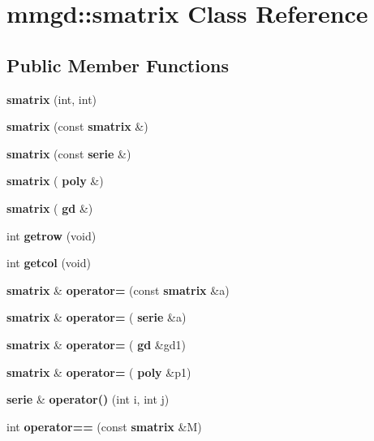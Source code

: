 \section{mmgd\+:\+:smatrix Class Reference}
\label{classmmgd_1_1smatrix}
\subsection*{Public Member Functions}
\begin{DoxyCompactItemize}
\item 
\mbox{\label{classmmgd_1_1smatrix_a175fc2703b8ffa5b6308c8ab6449f3e2}} 
{\bfseries smatrix} (int, int)
\item 
\mbox{\label{classmmgd_1_1smatrix_af94d3fe1607ac05e049f930c8ae12ea9}} 
{\bfseries smatrix} (const \textbf{ smatrix} \&)
\item 
\mbox{\label{classmmgd_1_1smatrix_a4f365fd4d1ba7decbab9ab0d66b7aed7}} 
{\bfseries smatrix} (const \textbf{ serie} \&)
\item 
\mbox{\label{classmmgd_1_1smatrix_a1ab2721af28124648faa279cea205d91}} 
{\bfseries smatrix} (\textbf{ poly} \&)
\item 
\mbox{\label{classmmgd_1_1smatrix_a4efebaaf81df5c7e67752e54470e8025}} 
{\bfseries smatrix} (\textbf{ gd} \&)
\item 
\mbox{\label{classmmgd_1_1smatrix_adb8385c2afd74935aeff640f67059f04}} 
int {\bfseries getrow} (void)
\item 
\mbox{\label{classmmgd_1_1smatrix_a5ef4a570edc52de17e8b80eaf095b821}} 
int {\bfseries getcol} (void)
\item 
\mbox{\label{classmmgd_1_1smatrix_ac71794ee7a05765a948b1a766ac907be}} 
\textbf{ smatrix} \& {\bfseries operator=} (const \textbf{ smatrix} \&a)
\item 
\mbox{\label{classmmgd_1_1smatrix_a7a91c38c299f6298be6e02a3589b0fbb}} 
\textbf{ smatrix} \& {\bfseries operator=} (\textbf{ serie} \&a)
\item 
\mbox{\label{classmmgd_1_1smatrix_a341d8a5ac99e9cc51d0a55eca238cc89}} 
\textbf{ smatrix} \& {\bfseries operator=} (\textbf{ gd} \&gd1)
\item 
\mbox{\label{classmmgd_1_1smatrix_af9c342388d0a9f8ee12d7c4f904cfbcd}} 
\textbf{ smatrix} \& {\bfseries operator=} (\textbf{ poly} \&p1)
\item 
\mbox{\label{classmmgd_1_1smatrix_a775f59dbe9287e68869b4bbd943499ad}} 
\textbf{ serie} \& {\bfseries operator()} (int i, int j)
\item 
\mbox{\label{classmmgd_1_1smatrix_a29be971a2211c193684b1b608ccdad7f}} 
int {\bfseries operator==} (const \textbf{ smatrix} \&M)
\end{DoxyCompactItemize}
